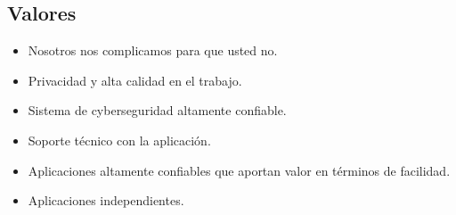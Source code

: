 \documentclass{article}
\begin{document}
\subsection{Valores}
\begin{itemize}
    \item Nosotros nos complicamos para que usted no.
    \item Privacidad y alta calidad en el trabajo.
    \item Sistema de cyberseguridad altamente confiable.
    \item Soporte técnico con la aplicación.
    \item Aplicaciones altamente confiables que aportan valor en términos de facilidad.
    \item Aplicaciones independientes.
\end{itemize}


\end{document}
